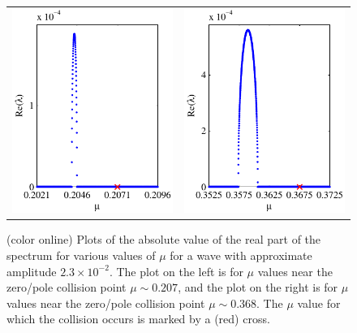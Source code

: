 \documentclass[review,onefignum,onetabnum]{siamart171218}
\begin{document}
\begin{figure}[ht]%
\begin{center}
\begin{tabular}{cc}
\includegraphics{BubbleK005Mu20} &
\includegraphics{BubbleK005Mu36}
\end{tabular}
\caption{(color online) Plots of the absolute value of the real part of the spectrum
for various values of $\mu$ for a wave with approximate amplitude $2.3\times10^{-2}$.
The plot on the left is for $\mu$ values near the zero/pole collision point $\mu\sim0.207$,
and the plot on the right is for $\mu$ values near the zero/pole collision point $\mu\sim0.368$. The $\mu$ value
for which the collision occurs is marked by a (red) cross.}
\label{f:specamp}
\end{center}
\end{figure}
\end{document}
